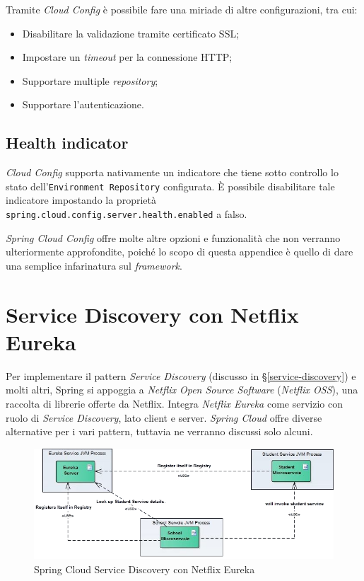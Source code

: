 Tramite \textit{Cloud Config} è possibile fare una miriade di altre configurazioni, tra cui:

\begin{itemize}
	\item Disabilitare la validazione tramite certificato SSL;
	\item Impostare un \textit{timeout} per la connessione HTTP;
	\item Supportare multiple \textit{repository};
	\item Supportare l'autenticazione.
\end{itemize}

\subsection{Health indicator} \textit{Cloud Config} supporta nativamente un indicatore che
tiene sotto controllo lo stato dell'\texttt{Environment Repository} configurata.
È possibile disabilitare tale indicatore impostando la proprietà \texttt{spring.cloud.config.server.health.enabled} a falso.

\bigskip

\textit{Spring Cloud Config} offre molte altre opzioni e funzionalità che non verranno ulteriormente approfondite, poiché lo scopo di questa appendice è quello di dare una semplice infarinatura sul \textit{framework}.


\section{Service Discovery con Netflix Eureka}

Per implementare il pattern \textit{Service Discovery} (discusso in \S\ref{service-discovery}) e molti altri, Spring si appoggia a \textit{Netflix Open Source Software} (\textit{Netflix OSS}), una raccolta di librerie offerte da Netflix.
Integra \textit{Netflix Eureka} come servizio con ruolo di \textit{Service Discovery}, lato client e server. \textit{Spring Cloud} offre diverse alternative per i vari pattern, tuttavia ne verranno discussi solo alcuni.

\begin{figure}[H]
	\centering
	\includegraphics[width=\textwidth]{immagini/netflix-eureka.png}
	\caption[Spring Cloud Service Discovery con Netflix Eureka]{Spring Cloud Service Discovery con Netflix Eureka\footnotemark}
	\label{netflix-eureka}
\end{figure}

